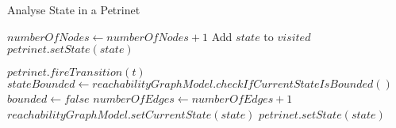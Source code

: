 \begin{algorithm}
\caption{Analyse State in a Petrinet}
\label{algorithm:analyser}
\begin{algorithmic}


    	\State \Return
    \EndIf
        \State \Return
    \EndIf
    \State $numberOfNodes \gets numberOfNodes + 1$
    \State Add $state$ to $visited$
    \State $petrinet.setState(state)$

        \State $petrinet.fireTransition(t)$
        \State $stateBounded \gets reachabilityGraphModel.checkIfCurrentStateIsBounded()$
            \State $bounded \gets false$
            \State \Return
        \EndIf
        \State $numberOfEdges \gets numberOfEdges + 1$
        \State {}
        \State $reachabilityGraphModel.setCurrentState(state)$
        \State $petrinet.setState(state)$
    \EndFor
\EndFunction

\end{algorithmic}
\end{algorithm}


